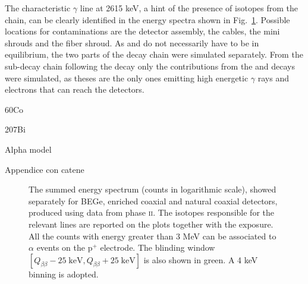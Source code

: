  The characteristic $\gamma$ line at 2615 keV, a hint of the presence of isotopes from the  chain, can be clearly identified in the energy spectra shown in Fig.~\ref{fig:data}. Possible locations for contaminations are the detector assembly, the cables, the mini shrouds and the fiber shroud. As  and  do not necessarily have to be in equilibrium, the two parts of the decay chain were simulated separately. From the sub-decay chain following the  decay only the contributions from the  and  decays were simulated, as theses are the only ones emitting high energetic $\gamma$ rays and electrons that can reach the detectors.

{\color{red}60Co}%

{\color{red}207Bi}%

{\color{red}Alpha model}%

{\color{red}Appendice con catene}
\begin{landscape}
\begin{figure}
	\centering
	
	\caption{The summed energy spectrum (counts in logarithmic scale), showed separately for BEGe, enriched coaxial and natural coaxial detectors, produced using data from {\gerda} phase \textsc{ii}. The isotopes responsible for the relevant lines are reported on the plots together with the exposure. All the counts with energy greater than 3 MeV can be associated to $\alpha$ events on the p$^+$ electrode. The blinding window $\left[Q_{\beta\beta}-25\;\text{keV},Q_{\beta\beta}+25\;\text{keV}\right]$ is also shown in green. A 4 keV binning is adopted.}
	\label{fig:data}
\end{figure}
\end{landscape}
